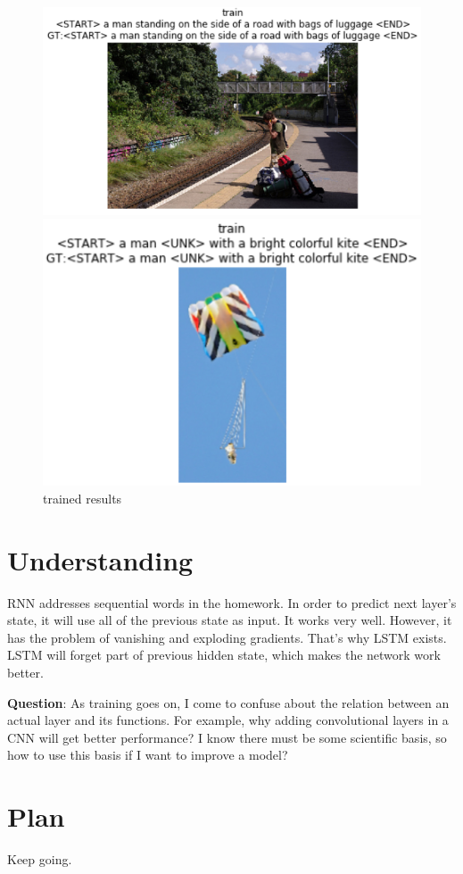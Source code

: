 \documentclass{article}
\begin{document}
\begin{figure}[htbp]
	\centering
	\begin{minipage}[t]{0.5\textwidth}
		\centering
		\includegraphics[width=1.0\textwidth]{7.png}
	\end{minipage}
	\begin{minipage}[t]{0.4\textwidth}
		\centering
		\includegraphics[width=1.0\textwidth]{8.png}
	\end{minipage}
	\caption{trained results} 
\end{figure}

\section{Understanding}
RNN addresses sequential words in the homework. In order to predict next layer's state, it will use all of the previous state as input. It works very well. However, it has the problem of vanishing and exploding gradients. That's why LSTM exists. LSTM will forget part of previous hidden state, which makes the network work better. 

\textbf{Question}: As training goes on, I come to confuse about the relation between an actual layer and its functions. For example, why adding convolutional layers in a CNN will get better performance? I know there must be some scientific basis, so how to use this basis if I want to improve a model?

\section{Plan}
Keep going.
\end{document}
